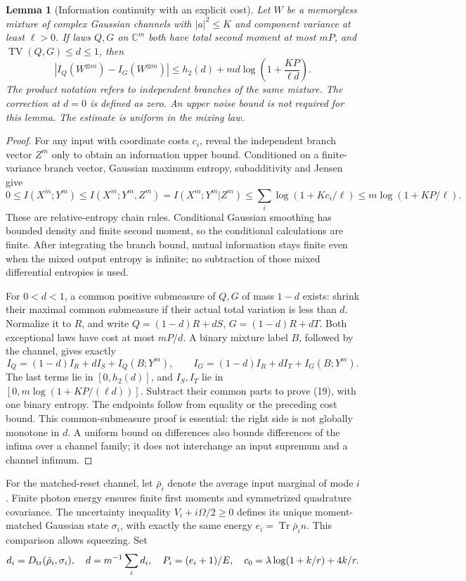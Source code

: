 \documentclass[11pt]{article}
\newtheorem{lemma}[theorem]{Lemma}
\newcommand{\C}{\mathbb C}
\newcommand{\Tr}{\operatorname{Tr}}
\begin{document}
\begin{lemma}[Information continuity with an explicit cost]
\label{lem:tv}
Let \(W\) be a memoryless mixture of complex Gaussian channels with
\(|a|^2\leq K\) and component variance at least \(\ell>0\).
If laws \(Q,G\) on \(\C^m\) both have total second moment at most
\(mP\), and \(\operatorname{TV}(Q,G)\leq d\leq1\), then
\[
 |I_Q(W^{\otimes m})-I_G(W^{\otimes m})|
 \leq h_2(d)+md\log\left(1+\frac{KP}{\ell d}\right).       \tag{19}
\]
The product notation refers to independent branches of the same mixture.
The correction at \(d=0\) is defined as zero. An upper noise bound is
not required for this lemma. The estimate is uniform in the mixing law.
\end{lemma}
\begin{proof}
For any input with coordinate costs \(c_i\), reveal the independent
branch vector \(Z^m\) only to obtain an information upper bound.
Conditioned on a finite-variance branch vector, Gaussian maximum entropy,
subadditivity and Jensen give
\[
 0\leq I(X^m;Y^m)\leq I(X^m;Y^m,Z^m)
 =I(X^m;Y^m|Z^m)
 \leq\sum_i\log(1+Kc_i/\ell)
 \leq m\log(1+KP/\ell).
\]
These are relative-entropy chain rules. Conditional Gaussian smoothing
has bounded density and finite second moment, so the conditional
calculations are finite. After integrating the branch bound, mutual
information stays finite even when the mixed output entropy is infinite;
no subtraction of those mixed differential entropies is used.

For \(0<d<1\), a common positive submeasure of \(Q,G\) of mass \(1-d\)
exists: shrink their maximal common submeasure if their actual total
variation is less than \(d\). Normalize it to \(R\), and write
\(Q=(1-d)R+dS\), \(G=(1-d)R+dT\). Both exceptional laws have cost
at most \(mP/d\). A binary mixture label \(B\), followed by the channel,
gives exactly
\[
 I_Q=(1-d)I_R+dI_S+I_Q(B;Y^m),\qquad
 I_G=(1-d)I_R+dI_T+I_G(B;Y^m).
\]
The last terms lie in \([0,h_2(d)]\), and \(I_S,I_T\) lie in
\([0,m\log(1+KP/(\ell d))]\). Subtract their common parts to prove
(19), with one binary entropy. The endpoints follow from equality or
the preceding cost bound. This common-submeasure proof is essential:
the right side is not globally monotone in \(d\). A uniform bound on
differences also bounds differences of the infima over a channel family;
it does not interchange an input supremum and a channel infimum.
\end{proof}

For the matched-reset channel, let \(\bar\rho_i\) denote the average
input marginal of mode \(i\). Finite photon energy ensures finite first
moments and symmetrized quadrature covariance. The uncertainty inequality
\(V_i+i\Omega/2\geq0\) defines its unique moment-matched Gaussian
state \(\sigma_i\), with exactly the same energy
\(e_i=\Tr\bar\rho_i n\). This comparison allows squeezing.
Set
\[
 d_i=D_{\rm tr}(\bar\rho_i,\sigma_i),\quad
 d=m^{-1}\sum_i d_i,\quad P_i=(e_i+1)/E,\quad
 c_0=\lambda\log(1+k/r)+4k/r.
\]
\end{document}
